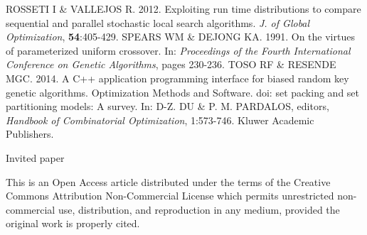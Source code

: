\begin{biblio}[REFERENCES]
 ROSSETI I \& VALLEJOS R. 2012. Exploiting run time distributions to compare sequential and parallel stochastic local search algorithms. \textit{J. of Global Optimization}, \textbf{54}:405-429.
\tit{ }SPEARS WM \& DEJONG KA. 1991. On the virtues of parameterized uniform crossover. In: \textit{Proceedings of the Fourth International Conference on Genetic Algorithms}, pages 230-236.
\tit{ }TOSO RF \& RESENDE MGC. 2014. A C++ application programming interface for biased random key genetic algorithms. Optimization Methods and Software. doi: \protect{}
 set packing and set partitioning models: A survey. In: D-Z. DU \& P. M. PARDALOS, editors, \textit{Handbook of Combinatorial Optimization}, 1:573-746. Kluwer Academic Publishers.
\end{biblio}

\medskip\par\noindent
\footnotesize{Invited paper\\}

\medskip\par\noindent
\footnotesize{This is an Open Access article distributed under the terms of the Creative Commons Attribution Non-Commercial License which permits unrestricted non-commercial use, distribution, and reproduction in any medium, provided the original work is properly cited. }
